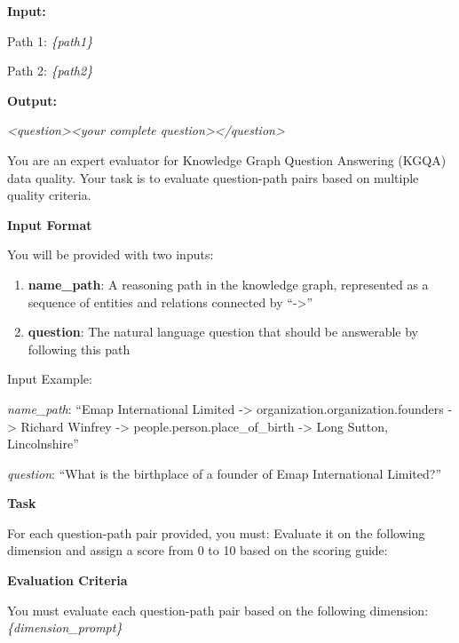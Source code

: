 \begin{tcolorbox}
\textbf{Input:}

Path 1: \textcolor{teal!70!black}{\textit{\{path1\}}}

Path 2: \textcolor{teal!70!black}{\textit{\{path2\}}}

\textbf{Output:}

\textcolor{green!70!black}{\textit{<question>}}\textit{<your complete question>}\textcolor{green!70!black}{\textit{</question>}}
\end{tcolorbox}

\begin{tcolorbox}[
  colback=white,
  colframe=blue!60,
  colbacktitle=blue!30,
  coltitle=white,
  fonttitle=\bfseries\scriptsize,
  fontupper=\scriptsize,
  title=Data Quality Evaluation Prompt Template,
  rounded corners,
  boxrule=0.5pt
]
You are an expert evaluator for Knowledge Graph Question Answering (KGQA) data quality. Your task is to evaluate question-path pairs based on multiple quality criteria.

\textbf{Input Format}

You will be provided with two inputs:
\begin{enumerate}
  \item \textbf{name\_path}: A reasoning path in the knowledge graph, represented as a sequence of entities and relations connected by ``->''
  \item \textbf{question}: The natural language question that should be answerable by following this path
\end{enumerate}

Input Example:

\textit{name\_path}: ``Emap International Limited -> organization.organization.founders -> Richard Winfrey -> people.person.place\_of\_birth -> Long Sutton, Lincolnshire''

\textit{question}: ``What is the birthplace of a founder of Emap International Limited?''

\textbf{Task}

For each question-path pair provided, you must:
Evaluate it on the following dimension and assign a score from 0 to 10 based on the scoring guide:

\textbf{Evaluation Criteria}

You must evaluate each question-path pair based on the following dimension:
\textcolor{teal!70!black}{\textit{\{dimension\_prompt\}}}


\end{tcolorbox}
